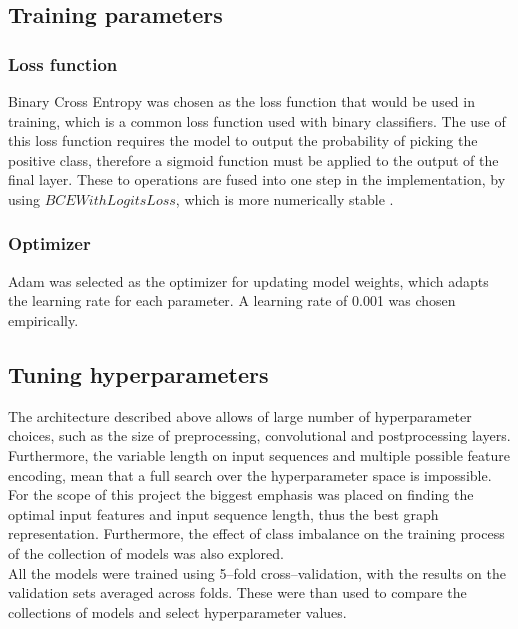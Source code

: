 \subsection{Training parameters}

\subsubsection{Loss function}
Binary Cross Entropy was chosen as the loss function that would be used in training, which is a common loss function used with binary classifiers. 
The use of this loss function requires the model to output the probability of picking the positive class, therefore a sigmoid function must be applied to the output of the final layer.
These to operations are fused into one step in the implementation, by using  $BCEWithLogitsLoss$, which is more numerically stable  \cite{Ansel_PyTorch_2_Faster_2024}.

\subsubsection{Optimizer}
Adam was selected as the optimizer for updating model weights, which adapts the learning rate for each parameter. A learning rate of 0.001 was chosen empirically.

\subsection{Tuning hyperparameters}
The architecture described above allows of large number of hyperparameter choices, such as the size of preprocessing, convolutional and postprocessing layers. Furthermore, the variable length on input sequences and multiple possible feature encoding, mean that a full search over the hyperparameter space is impossible. For the scope of this project the biggest emphasis was placed on finding the optimal input features and input sequence length, thus the best graph representation. Furthermore, the effect of class imbalance on the training process of the collection of models was also explored.\\
All the models were trained using 5--fold cross--validation, with the results on the validation sets averaged across folds. These were than used to compare the collections of models and select hyperparameter values.